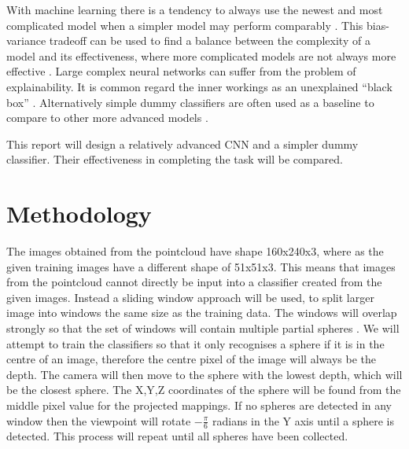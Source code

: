 \documentclass{article}
\begin{document}
With machine learning there is a tendency to always use the newest and most complicated model when a simpler model may perform comparably \cite{forbes2020}.
This bias-variance tradeoff can be used to find a balance between the complexity of a model and its effectiveness, where more complicated models are not always more effective \cite{neal2018modern}.
Large complex neural networks can suffer from the problem of explainability.
It is common regard the inner workings as an unexplained ``black box'' \cite{zednik2019solving}.
Alternatively simple dummy classifiers are often used as a baseline to compare to other more advanced models \cite{dummyclassifier_2019}.

This report will design a relatively advanced CNN and a simpler dummy classifier.
Their effectiveness in completing the task will be compared.  

\section{Methodology}

The images obtained from the pointcloud have shape 160x240x3, where as the given training images have a different shape of 51x51x3.
This means that images from the pointcloud cannot directly be input into a classifier created from the given images.
Instead a sliding window approach will be used, to split larger image into windows the same size as the training data.
The windows will overlap strongly so that the set of windows will contain multiple partial spheres \cite{forsyth2002computer}.
We will attempt to train the classifiers so that it only recognises a sphere if it is in the centre of an image, therefore the centre pixel of the image will always be the depth.
The camera will then move to the sphere with the lowest depth, which will be the closest sphere.
The X,Y,Z coordinates of the sphere will be found from the middle pixel value for the projected mappings.
If no spheres are detected in any window then the viewpoint will rotate $-\frac{\pi}{6}$ radians in the Y axis until a sphere is detected.
This process will repeat until all spheres have been collected.
\end{document}
